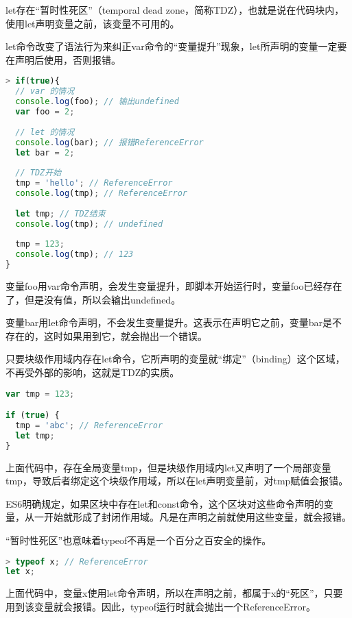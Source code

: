 let存在“暂时性死区”（temporal dead zone，简称TDZ），也就是说在代码块内，使用let声明变量之前，该变量不可用的。

let命令改变了语法行为来纠正var命令的“变量提升”现象，let所声明的变量一定要在声明后使用，否则报错。

\begin{lstlisting}[language=JavaScript]
> if(true){
  // var 的情况
  console.log(foo); // 输出undefined
  var foo = 2;
  
  // let 的情况
  console.log(bar); // 报错ReferenceError
  let bar = 2;
  
  // TDZ开始
  tmp = 'hello'; // ReferenceError
  console.log(tmp); // ReferenceError
  
  let tmp; // TDZ结束
  console.log(tmp); // undefined
  
  tmp = 123;
  console.log(tmp); // 123
}
\end{lstlisting}

\begin{compactitem}
\item 变量foo用var命令声明，会发生变量提升，即脚本开始运行时，变量foo已经存在了，但是没有值，所以会输出undefined。
\item 变量bar用let命令声明，不会发生变量提升。这表示在声明它之前，变量bar是不存在的，这时如果用到它，就会抛出一个错误。
\end{compactitem}

只要块级作用域内存在let命令，它所声明的变量就“绑定”（binding）这个区域，不再受外部的影响，这就是TDZ的实质。

\begin{lstlisting}[language=JavaScript]
var tmp = 123;

if (true) {
  tmp = 'abc'; // ReferenceError
  let tmp;
}
\end{lstlisting}

上面代码中，存在全局变量tmp，但是块级作用域内let又声明了一个局部变量tmp，导致后者绑定这个块级作用域，所以在let声明变量前，对tmp赋值会报错。

ES6明确规定，如果区块中存在let和const命令，这个区块对这些命令声明的变量，从一开始就形成了封闭作用域。凡是在声明之前就使用这些变量，就会报错。

“暂时性死区”也意味着typeof不再是一个百分之百安全的操作。

\begin{lstlisting}[language=JavaScript]
> typeof x; // ReferenceError
let x;
\end{lstlisting}


上面代码中，变量x使用let命令声明，所以在声明之前，都属于x的“死区”，只要用到该变量就会报错。因此，typeof运行时就会抛出一个ReferenceError。

